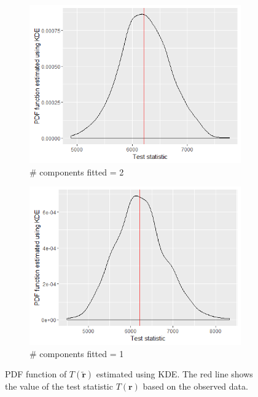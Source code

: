 \begin{figure}[!htb]
\begin{subfigure}[b]{0.4\textwidth}
		\includegraphics[width=\textwidth]{mainmatter/chapter_5_simulation_study/ppc_5wellsep2comp.png}
          \caption{\label{fig : ppc_5wellsep2comp}\# components fitted = 2}
	\end{subfigure}
	\begin{subfigure}[b]{0.4\textwidth}
		\includegraphics[width=\textwidth]{mainmatter/chapter_5_simulation_study/ppc_5wellsep1comp.png}
          \caption{\label{fig : ppc_5wellsep1comp}\# components fitted = 1}
	\end{subfigure}
	\caption{PDF function of $T(\boldsymbol{\tilde{r}})$ estimated using KDE. The red line shows the value of the test statistic $T(\boldsymbol{r})$ based on the observed data.}
	\label{fig : ppc_5wellsepcomp}    
\end{figure}


